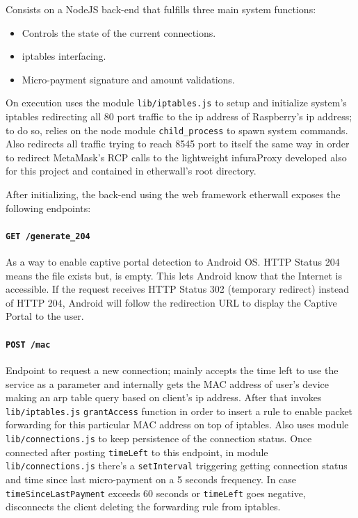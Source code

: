 \documentclass[12pt]{amsart}
\begin{document}
\begin{multicols}{2}
\vspace{0.35cm}

Consists on a NodeJS back-end that fulfills three main system functions:

\begin{itemize}
\item Controls the state of the current connections.
\item iptables interfacing.
\item Micro-payment signature and amount validations.
\end{itemize}

On execution uses the module \texttt{lib/iptables.js}
to setup and initialize system's iptables redirecting
all 80 port traffic to the ip address of Raspberry's
ip address; to do so, relies on the node module \texttt{child\_process}
to spawn system commands. Also redirects all traffic trying
to reach 8545 port to itself the same way in order to
redirect MetaMask's RCP calls to the lightweight infuraProxy\cite{infuraProxy}
developed also for this project and contained in etherwall's root directory.

\vspace{0.35cm}

After initializing, the back-end using the web framework\cite{express}
etherwall exposes the following endpoints:

\vspace{0.35cm}

\paragraph{\texttt{GET /generate\_204}} As a way to enable
captive portal detection to Android OS. HTTP Status 204
means the file exists but, is empty.
This lets Android know that the Internet is accessible.
If the request receives HTTP Status 302 (temporary redirect)
instead of HTTP 204, Android will follow the
redirection URL to display the Captive Portal to the user.

\vspace{0.35cm}

\paragraph{\texttt{POST /mac}} Endpoint to request a new
connection; mainly
accepts the time left to use the service as a parameter
and internally gets the MAC address of user's device
making an arp table query based on client's ip address.
After that invokes \texttt{lib/iptables.js} \texttt{grantAccess}
function in order to insert a rule to enable packet forwarding
for this particular MAC address on top of iptables.
Also uses module \texttt{lib/connections.js} to keep persistence
of the connection status. Once connected after posting
\texttt{timeLeft} to this endpoint, in module
\texttt{lib/connections.js} there's a \texttt{setInterval}
triggering getting connection status and time since last
micro-payment on a 5 seconds frequency. In case \texttt{timeSinceLastPayment}
exceeds 60 seconds or \texttt{timeLeft} goes negative,
disconnects the client deleting the forwarding rule from
iptables.


\end{multicols}
\end{document}
